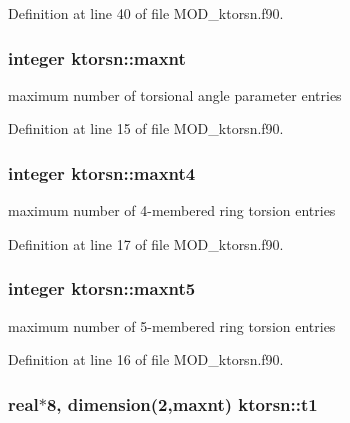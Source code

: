 Definition at line 40 of file M\-O\-D\-\_\-ktorsn.\-f90.

\hypertarget{classktorsn_a24826636e5e70f0f36f28baf53af9ceb}{
\subsubsection[{maxnt}]{\setlength{\rightskip}{0pt plus 5cm}integer ktorsn\-::maxnt}}\label{classktorsn_a24826636e5e70f0f36f28baf53af9ceb}


maximum number of torsional angle parameter entries 



Definition at line 15 of file M\-O\-D\-\_\-ktorsn.\-f90.

\hypertarget{classktorsn_a5a45df497069015a810999bb1fab9abe}{
\subsubsection[{maxnt4}]{\setlength{\rightskip}{0pt plus 5cm}integer ktorsn\-::maxnt4}}\label{classktorsn_a5a45df497069015a810999bb1fab9abe}


maximum number of 4-\/membered ring torsion entries 



Definition at line 17 of file M\-O\-D\-\_\-ktorsn.\-f90.

\hypertarget{classktorsn_a0391ba344c3a8a876ef6d3853b8e1a10}{
\subsubsection[{maxnt5}]{\setlength{\rightskip}{0pt plus 5cm}integer ktorsn\-::maxnt5}}\label{classktorsn_a0391ba344c3a8a876ef6d3853b8e1a10}


maximum number of 5-\/membered ring torsion entries 



Definition at line 16 of file M\-O\-D\-\_\-ktorsn.\-f90.

\hypertarget{classktorsn_a8cdbc5eef61129c393c4fecf38548baa}{
\subsubsection[{t1}]{\setlength{\rightskip}{0pt plus 5cm}real$\ast$8, dimension(2,{\bf maxnt}) ktorsn\-::t1}}\label{classktorsn_a8cdbc5eef61129c393c4fecf38548baa}


